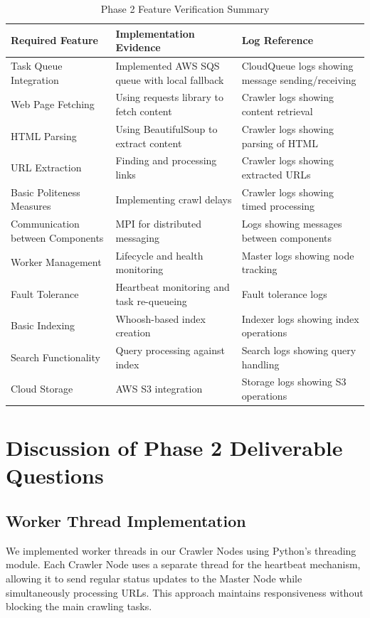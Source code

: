 \documentclass[12pt]{article}
\begin{document}
\begin{table}[h]
\centering
\begin{tabular}{|p{4cm}|p{6cm}|p{4cm}|}
\hline
\textbf{Required Feature} & \textbf{Implementation Evidence} & \textbf{Log Reference} \\
\hline
Task Queue Integration & Implemented AWS SQS queue with local fallback & CloudQueue logs showing message sending/receiving \\
\hline
Web Page Fetching & Using requests library to fetch content & Crawler logs showing content retrieval \\
\hline
HTML Parsing & Using BeautifulSoup to extract content & Crawler logs showing parsing of HTML \\
\hline
URL Extraction & Finding and processing links & Crawler logs showing extracted URLs \\
\hline
Basic Politeness Measures & Implementing crawl delays & Crawler logs showing timed processing \\
\hline
Communication between Components & MPI for distributed messaging & Logs showing messages between components \\
\hline 
Worker Management & Lifecycle and health monitoring & Master logs showing node tracking \\
\hline
Fault Tolerance & Heartbeat monitoring and task re-queueing & Fault tolerance logs \\
\hline
Basic Indexing & Whoosh-based index creation & Indexer logs showing index operations \\
\hline
Search Functionality & Query processing against index & Search logs showing query handling \\
\hline
Cloud Storage & AWS S3 integration & Storage logs showing S3 operations \\
\hline
\end{tabular}
\caption{Phase 2 Feature Verification Summary}
\label{tab:feature_verification}
\end{table}

\section{Discussion of Phase 2 Deliverable Questions}

\subsection{Worker Thread Implementation}
We implemented worker threads in our Crawler Nodes using Python's threading module. Each Crawler Node uses a separate thread for the heartbeat mechanism, allowing it to send regular status updates to the Master Node while simultaneously processing URLs. This approach maintains responsiveness without blocking the main crawling tasks.
\end{document}
